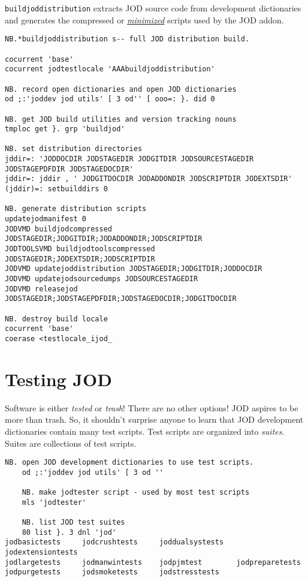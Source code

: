   \texttt{buildjoddistribution} extracts JOD source code from development dictionaries and generates the compressed or 
    \href{https://en.wikipedia.org/wiki/Minification_(programming)}{\emph{minimized}} scripts 
    used by the JOD addon.
    
\begin{lstlisting}[frame=single,framerule=0pt,basicstyle=\ttfamily\footnotesize]
NB.*buildjoddistribution s-- full JOD distribution build.

cocurrent 'base'
cocurrent jodtestlocale 'AAAbuildjoddistribution'

NB. record open dictionaries and open JOD dictionaries
od ;:'joddev jod utils' [ 3 od'' [ ooo=: }. did 0

NB. get JOD build utilities and version tracking nouns
tmploc get }. grp 'buildjod'

NB. set distribution directories
jddir=: 'JODDOCDIR JODSTAGEDIR JODGITDIR JODSOURCESTAGEDIR JODSTAGEPDFDIR JODSTAGEDOCDIR'
jddir=: jddir , ' JODGITDOCDIR JODADDONDIR JODSCRIPTDIR JODEXTSDIR' 
(jddir)=: setbuilddirs 0

NB. generate distribution scripts
updatejodmanifest 0
JODVMD buildjodcompressed JODSTAGEDIR;JODGITDIR;JODADDONDIR;JODSCRIPTDIR
JODTOOLSVMD buildjodtoolscompressed JODSTAGEDIR;JODEXTSDIR;JODSCRIPTDIR
JODVMD updatejoddistribution JODSTAGEDIR;JODGITDIR;JODDOCDIR
JODVMD updatejodsourcedumps JODSOURCESTAGEDIR
JODVMD releasejod JODSTAGEDIR;JODSTAGEPDFDIR;JODSTAGEDOCDIR;JODGITDOCDIR

NB. destroy build locale
cocurrent 'base'
coerase <testlocale_ijod_
\end{lstlisting}

   \newpage
    \section{Testing JOD}

 Software is either \emph{tested} or \emph{trash}! There are no other
options! JOD aspires to be more than trash. So, it shouldn't surprise
anyone to learn that JOD development dictionaries contain many test
scripts. Test scripts are organized into \emph{suites}. Suites are
collections of test scripts.

\begin{lstlisting}[frame=single,framerule=0pt,basicstyle=\ttfamily\footnotesize]    
    NB. open JOD development dictionaries to use test scripts.
    od ;:'joddev jod utils' [ 3 od ''

    NB. make jodtester script - used by most test scripts
    mls 'jodtester'

    NB. list JOD test suites
    80 list }. 3 dnl 'jod'
jodbasictests     jodcrushtests     joddualsystests   jodextensiontests 
jodlargetests     jodmanwintests    jodpjmtest        jodpreparetests   
jodpurgetests     jodsmoketests     jodstresstests  
\end{lstlisting} 

